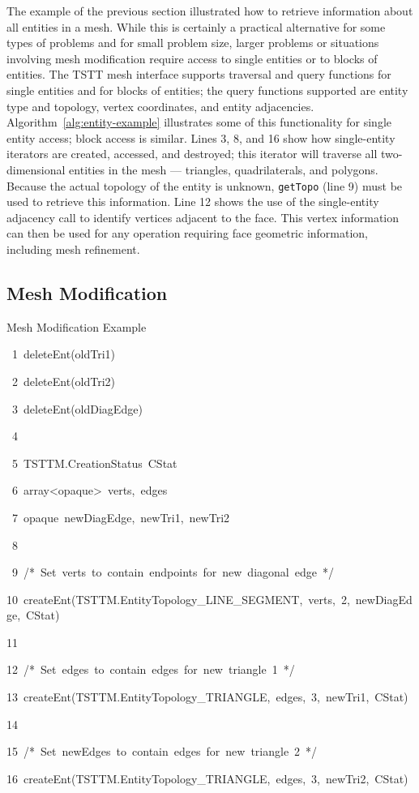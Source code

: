 The example of the previous section illustrated how to retrieve information
about all entities in a mesh. While this is certainly a practical
alternative for some types of problems and for small problem size,
larger problems or situations involving mesh modification require
access to single entities or to blocks of entities. The TSTT mesh
interface supports traversal and query functions for single entities
and for blocks of entities; the query functions supported are entity
type and topology, vertex coordinates, and entity adjacencies. Algorithm~\ref{alg:entity-example}
illustrates some of this functionality for single entity access; block
access is similar. Lines 3, 8, and 16 show how single-entity iterators
are created, accessed, and destroyed; this iterator will traverse
all two-dimensional entities in the mesh --- triangles, quadrilaterals,
and polygons. Because the actual topology of the entity is unknown,
\texttt{getTopo} (line 9) must be used to retrieve this information.
Line 12 shows the use of the single-entity adjacency call to identify
vertices adjacent to the face. This vertex information can then be
used for any operation requiring face geometric information, including
mesh refinement.

\subsection{Mesh Modification\label{sub:Mesh-Modification}}

%
\begin{algorithm*}

\caption{Mesh Modification Example\label{alg:Mesh-Modification-Example}}

\begin{lyxcode}
~1~deleteEnt(oldTri1)

~2~deleteEnt(oldTri2)

~3~deleteEnt(oldDiagEdge)

~4

~5~TSTTM.CreationStatus~CStat

~6~array<opaque>~verts,~edges

~7~opaque~newDiagEdge,~newTri1,~newTri2

~8~

~9~/{*}~Set~verts~to~contain~endpoints~for~new~diagonal~edge~{*}/

10~createEnt(TSTTM.EntityTopology\_LINE\_SEGMENT,~verts,~2,~newDiagEdge,~CStat)

11~

12~/{*}~Set~edges~to~contain~edges~for~new~triangle~1~{*}/

13~createEnt(TSTTM.EntityTopology\_TRIANGLE,~edges,~3,~newTri1,~CStat)

14

15~/{*}~Set~newEdges~to~contain~edges~for~new~triangle~2~{*}/

16~createEnt(TSTTM.EntityTopology\_TRIANGLE,~edges,~3,~newTri2,~CStat)
\end{lyxcode}

\end{algorithm*}


